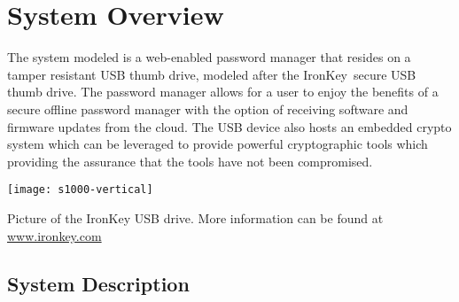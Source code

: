 \chapter{System Overview}
\label{ch:System Overview}
The system modeled is a web-enabled password manager that resides on a
tamper resistant USB thumb drive, modeled after the
IronKey\texttrademark~secure USB thumb drive. The password manager
allows for a user to enjoy the benefits of a secure offline password
manager with the option of receiving software and firmware updates from the
cloud. The USB device also hosts an embedded crypto system which can be
leveraged to provide powerful cryptographic tools which providing the assurance
that the tools have not been compromised.

\begin{marginfigure}%
\centering
  \texttt{[image: s1000-vertical]}
  \caption{Picture of the IronKey USB drive.  More information can be
found at \url{www.ironkey.com}}
  \label{fig:ik}
\end{marginfigure}



\section{System Description}
\label{sec:sysdesc}

